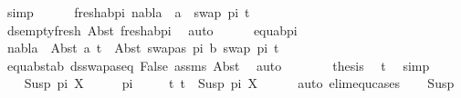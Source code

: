 \begin{isabellebody}
\ simp\isanewline
\isanewline
\ \ \ \ \isamarkupfalse%
\ fresh{\isacharunderscore}{\kern0pt}ab{\isacharunderscore}{\kern0pt}pi{}{\isacharcolon}{\kern0pt}\ {\isachardoublequoteopen}nabla\ {\isasymturnstile}\ a\ {\isasymsharp}\ swap\ pi{}\ t{}{\isacharprime}{\kern0pt}{\isachardoublequoteclose}\isanewline
\ \ \ \ \ \ \isamarkupfalse%
\ ds{\isacharunderscore}{\kern0pt}empty{\isacharunderscore}{\kern0pt}fresh{\isacharunderscore}{\kern0pt}{}\ Abst{\isacharparenleft}{\kern0pt}{}{\isacharparenright}{\kern0pt}\ fresh{\isacharunderscore}{\kern0pt}ab{\isacharunderscore}{\kern0pt}pi{}\ \isamarkupfalse%
\ auto\isanewline
\ \ \ \ \isamarkupfalse%
\ equ{\isacharunderscore}{\kern0pt}ab{\isacharunderscore}{\kern0pt}pi{}\ \isamarkupfalse%
\ {\isachardoublequoteopen}nabla\ {\isasymturnstile}\ Abst\ a\ t{}{\isacharprime}{\kern0pt}\ {\isasymapprox}\ Abst\ {\isacharparenleft}{\kern0pt}swapas\ pi{}\ b{\isacharparenright}{\kern0pt}\ {\isacharparenleft}{\kern0pt}swap\ pi{}\ t{}{\isacharprime}{\kern0pt}{\isacharparenright}{\kern0pt}{\isachardoublequoteclose}\isanewline
\ \ \ \ \ \ \isamarkupfalse%
\ equ{\isacharunderscore}{\kern0pt}abst{\isacharunderscore}{\kern0pt}ab\ ds{\isacharunderscore}{\kern0pt}swapas{\isacharunderscore}{\kern0pt}eq\ False\ assms\ Abst{\isacharparenleft}{\kern0pt}{}{\isacharparenright}{\kern0pt}\ \isamarkupfalse%
\ auto\isanewline
\ \ \ \ \isamarkupfalse%
\ \isamarkupfalse%
\ {\isacharquery}{\kern0pt}thesis\ \isamarkupfalse%
\ t{}\ \isamarkupfalse%
\ simp\isanewline
\ \ \isamarkupfalse%
\isanewline
{}\isamarkupfalse%
\isanewline
\ \ \isamarkupfalse%
\ {\isacharparenleft}{\kern0pt}Susp\ pi{\isacharprime}{\kern0pt}\ X{\isacharparenright}{\kern0pt}\isanewline
\ \ \isamarkupfalse%
\ \isamarkupfalse%
\ pi\isanewline
\ \ \ \ \ t{}{\isacharcolon}{\kern0pt}\ {\isachardoublequoteopen}t{}\ {\isacharequal}{\kern0pt}\ Susp\ pi\ X{\isachardoublequoteclose}\isanewline
\ \ \ \ \isamarkupfalse%
\ {\isacharparenleft}{\kern0pt}auto\ elim{\isacharcolon}{\kern0pt}equ{\isachardot}{\kern0pt}cases{\isacharparenright}{\kern0pt}\isanewline
\ \ \isamarkupfalse%
\ Susp\ \isamarkupfalse%

\end{isabellebody}
